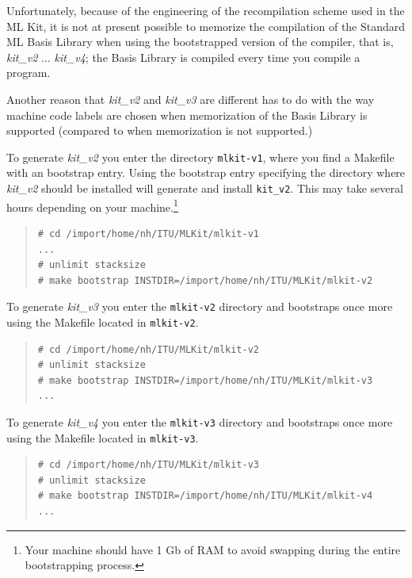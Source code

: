 \documentclass[12pt]{book}
\begin{document}
Unfortunately, because of the engineering of the recompilation scheme
used in the ML Kit, it is not at present possible to memorize the
compilation of the Standard ML Basis Library when using the
bootstrapped version of the compiler, that is, \emph{kit\_v2} $\ldots$
\emph{kit\_v4}; the Basis Library is compiled every time you compile a
program.

Another reason that \emph{kit\_v2} and \emph{kit\_v3} are different
has to do with the way machine code labels are chosen when
memorization of the Basis Library is supported (compared to when
memorization is not supported.)

To generate \emph{kit\_v2} you enter the directory \texttt{mlkit-v1},
where you find a Makefile with an bootstrap entry. Using the bootstrap
entry specifying the directory where \emph{kit\_v2} should be
installed will generate and install \texttt{kit\_v2}. This may take
several hours depending on your machine.\footnote{Your machine should
  have 1 Gb of RAM to avoid swapping during the entire bootstrapping
  process.}

\begin{small}
\begin{quote}
\begin{verbatim}
# cd /import/home/nh/ITU/MLKit/mlkit-v1
...
# unlimit stacksize
# make bootstrap INSTDIR=/import/home/nh/ITU/MLKit/mlkit-v2
\end{verbatim}
\end{quote}
\end{small}

To generate \emph{kit\_v3} you enter the \texttt{mlkit-v2} directory
and bootstraps once more using the Makefile located in
\texttt{mlkit-v2}.

\begin{small}
\begin{quote}
\begin{verbatim}
# cd /import/home/nh/ITU/MLKit/mlkit-v2
# unlimit stacksize
# make bootstrap INSTDIR=/import/home/nh/ITU/MLKit/mlkit-v3
...
\end{verbatim}
\end{quote}
\end{small}

To generate \emph{kit\_v4} you enter the \texttt{mlkit-v3} directory
and bootstraps once more using the Makefile located in
\texttt{mlkit-v3}.

\begin{small}
\begin{quote}
\begin{verbatim}
# cd /import/home/nh/ITU/MLKit/mlkit-v3
# unlimit stacksize
# make bootstrap INSTDIR=/import/home/nh/ITU/MLKit/mlkit-v4
...
\end{verbatim}
\end{quote}
\end{small}
\end{document}
